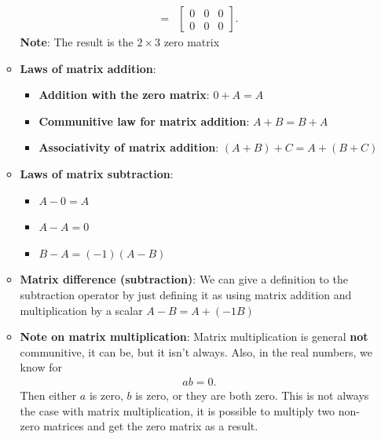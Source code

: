 \documentclass{report}
\begin{document}
\begin{itemize}
\begin{itemize}
\begin{align*}
                        = &\begin{bmatrix} 0 & 0 & 0 \\  0 & 0 & 0 \end{bmatrix}
                    .\end{align*}
                    \bigbreak \noindent 
                    \textbf{Note}: The result is the $2\times 3$ zero matrix
                \item \textbf{Laws of matrix addition}:
                    \begin{itemize}
                        \item \textbf{Addition with the zero matrix}:  $0 + A = A $
                        \item \textbf{Communitive law for matrix addition}: $A+B = B+A$
                        \item \textbf{Associativity of matrix addition}: $(A+B) + C = A + (B+C) $
                    \end{itemize}
                \item \textbf{Laws of matrix subtraction}:
                    \begin{itemize}
                        \item $A - 0 = A $
                        \item $A -A = 0 $
                        \item $B-A = (-1)(A-B) $
                    \end{itemize}
                \item \textbf{Matrix difference (subtraction)}: We can give a definition to the subtraction operator by just defining it as using matrix addition and multiplication by a scalar $A - B = A + (-1B) $
                \item \textbf{Note on matrix multiplication}: Matrix multiplication is general \textbf{not} communitive, it can be, but it isn't always. Also, in the real numbers, we know for
                    \begin{align*}
                        ab = 0
                    .\end{align*}
                    Then either $a$ is zero, $b$ is zero, or they are both zero. This is not always the case with matrix multiplication, it is possible to multiply two non-zero matrices and get the zero matrix as a result.

            \end{itemize}










    \end{itemize}
\end{document}
